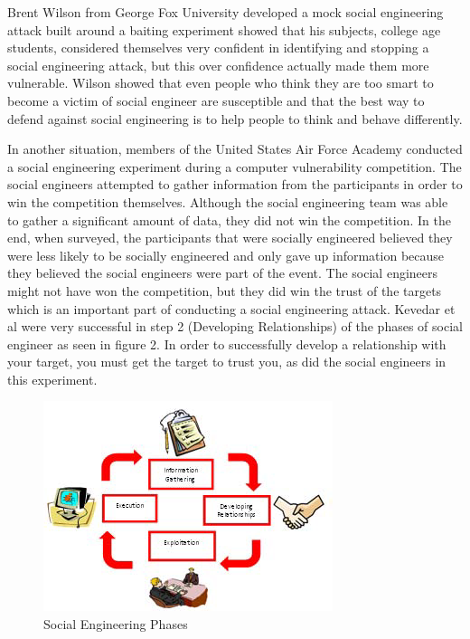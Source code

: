 \documentclass[conference]{IEEEtran}
\begin{document}
Brent Wilson from George Fox University developed a mock social engineering attack built around a baiting experiment showed that his subjects, college age students, considered themselves very confident in identifying and stopping a social engineering attack, but this over confidence actually made them more vulnerable\cite{Wilson:2018:ICS:3280489.3280529}.  Wilson showed that even people who think they are too smart to become a victim of social engineer are susceptible and that the best way to defend against social engineering is to help people to think and behave differently\cite{Wilson:2018:ICS:3280489.3280529}.

In another situation, members of the United States Air Force Academy conducted a social engineering experiment during a computer vulnerability competition. The social engineers attempted to gather information from the participants in order to win the competition themselves. Although the social engineering team was able to gather a significant amount of data, they did not win the competition.  In the end, when surveyed, the participants that were socially engineered believed they were less likely to be socially engineered and only gave up information because they believed the social engineers were part of the event\cite{Kvedar:2010:UFS:1858583.1858595}.  The social engineers might not have won the competition, but they did win the trust of the targets which is an important part of conducting a social engineering attack.  Kevedar et al were very successful in step 2 (Developing Relationships) of the phases of social engineer as seen in figure 2. In order to successfully develop a relationship with your target, you must get the target to trust you, as did the social engineers in this experiment. 
\begin{figure}[htbp]
\centerline{\includegraphics[scale= 1]{SocialEngineeringPhases.png}}
\caption{Social Engineering Phases \cite{Kvedar:2010:UFS:1858583.1858595}}
\label{fig}
\end{figure}
\end{document}
